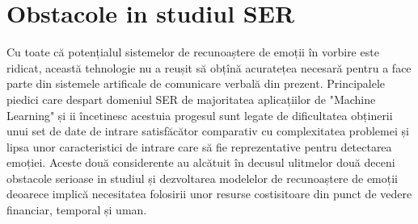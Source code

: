 \documentclass[a4paper,12pt]{book}
\begin{document}
			\section{Obstacole in studiul SER}	\label{obstacole}	
				 Cu toate că potențialul sistemelor de recunoaștere de emoții în vorbire este ridicat, această tehnologie nu a reușit să obțînă acuratețea necesară pentru a face parte din sistemele artificale de comunicare verbală din prezent. Principalele piedici care despart domeniul SER de majoritatea aplicațiilor de "Machine Learning" și ii încetinesc acestuia progesul sunt legate de dificultatea obținerii unui set de date de intrare satisfăcător comparativ cu complexitatea problemei și lipsa unor caracteristici de intrare care să fie reprezentative pentru detectarea emoției. Aceste două considerente au alcătuit în decusul ulitmelor două deceni obstacole serioase in studiul și dezvoltarea modelelor de recunoaștere de emoții deoarece implică necesitatea folosirii unor resurse costisitoare din punct de vedere financiar, temporal și uman.\par
				
\end{document}
